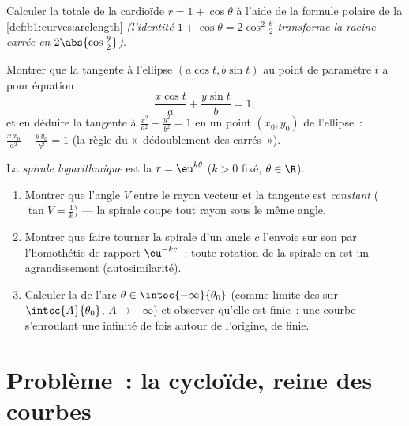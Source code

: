 \begin{exercise}[$\star\star$]\label{exo:b1:curves:10}
Calculer la  totale de la cardioïde $r = 1 + \cos\theta$
à l'aide de la formule polaire de la \cref{def:b1:curves:arclength}
\emph{(l'identité $1 + \cos\theta = 2\cos^2\frac\theta2$ transforme
la racine carrée en $2\abs{\cos\frac\theta2}$)}.
\end{exercise}

\begin{exercise}[$\star\star$]\label{exo:b1:curves:11}
Montrer que la tangente à l'ellipse $(a\cos t, b\sin t)$ au
point de paramètre $t$ a pour équation
\[
\frac{x\cos t}{a} + \frac{y\sin t}{b} = 1 ,
\]
et en déduire la tangente à $\frac{x^2}{a^2} + \frac{y^2}{b^2} = 1$
en un point $(x_0, y_0)$ de l'ellipse~: $\frac{x\,x_0}{a^2} +
\frac{y\,y_0}{b^2} = 1$ (la règle du «~dédoublement des carrés~»).
\end{exercise}

\begin{exercise}[$\star\star\star$]\label{exo:b1:curves:12}
La \emph{spirale logarithmique} est la  $r =
\eu^{k\theta}$ ($k > 0$ fixé, $\theta \in \R$).
\begin{enumerate}
  \item Montrer que l'angle $V$ entre le rayon vecteur et la
        tangente est \emph{constant} ($\tan V = \frac1k$) --- la
        spirale coupe tout rayon sous le même angle.
  \item Montrer que faire tourner la spirale d'un angle $c$ l'envoie
        sur son  par l'homothétie de rapport $\eu^{-kc}$~: toute
        rotation de la spirale en est un agrandissement
        (autosimilarité).
  \item Calculer la  de l'arc $\theta \in
        \intoc{-\infty}{\theta_0}$ (comme limite des  sur
        $\intcc{A}{\theta_0}$, $A \to -\infty$) et observer qu'elle
        est finie~: une courbe s'enroulant une infinité de fois
        autour de l'origine, de  finie.
\end{enumerate}
\end{exercise}

\section{Problème~: la cycloïde, reine des courbes}

